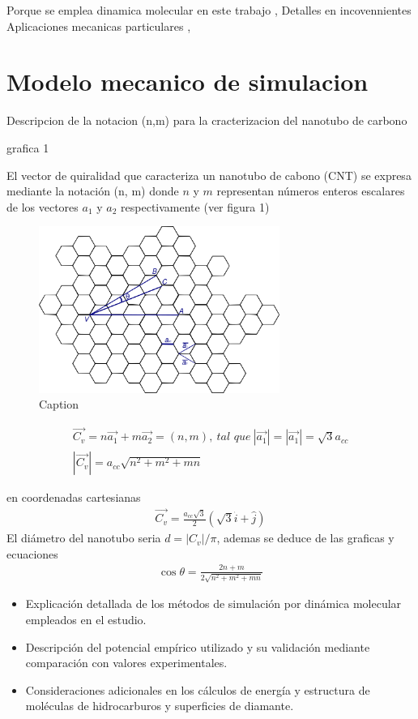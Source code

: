 \documentclass[a4paper]{article}
\begin{document}
Porque se emplea dinamica molecular en este trabajo \cite{najmi2023review}, \cite{shibuta2003molecular}
Detalles en incovennientes \cite{mylvaganam2004important}
Aplicaciones mecanicas particulares \cite{avila2008molecular}, \cite{chen2010molecular}
\section{Modelo mecanico de simulacion}
Descripcion de la notacion (n,m) para la cracterizacion del nanotubo de  carbono \cite{avila2008molecular}

grafica 1

El vector de quiralidad que caracteriza un nanotubo de cabono (CNT) se expresa mediante la notación (n, m) donde $n$ y $m$ representan números enteros escalares de los vectores $a_1$ y $a_2$ respectivamente (ver figura 1) 
\begin{figure}
    \centering
    \includegraphics[width=0.7\textwidth]{images/panal1.png}
    \caption{Caption}
    \label{fig:enter-label}
\end{figure}
\begin{align}
    \vec{C_v} = n\vec{a_1} + m \vec{a_2} = (n, m) , \ \textit{tal que} \ |\vec{a_1}| = |\vec{a_1}| = \sqrt{3} a_{cc} \\
     |\vec{C_v}| = a_{cc}\sqrt{n^2 + m^2 + mn} 
\end{align}

en coordenadas cartesianas
\begin{align}
    \vec{C_v} = \frac{a_{cc}\sqrt{3}}{2}(\sqrt{3} \hat{i} +  \hat{j})
\end{align}
El diámetro del nanotubo seria $d=|C_v|/\pi$, ademas se deduce de las graficas y ecuaciones
\begin{align}
    \cos{\theta} = \frac{2n+m}{2\sqrt{n^2 + m^2 + mn}}
\end{align}


\begin{itemize}
\item Explicación detallada de los métodos de simulación por dinámica molecular empleados en el estudio.
\item Descripción del potencial empírico utilizado y su validación mediante comparación con valores experimentales.
\item Consideraciones adicionales en los cálculos de energía y estructura de moléculas de hidrocarburos y superficies de diamante.
\end{itemize}
\end{document}

